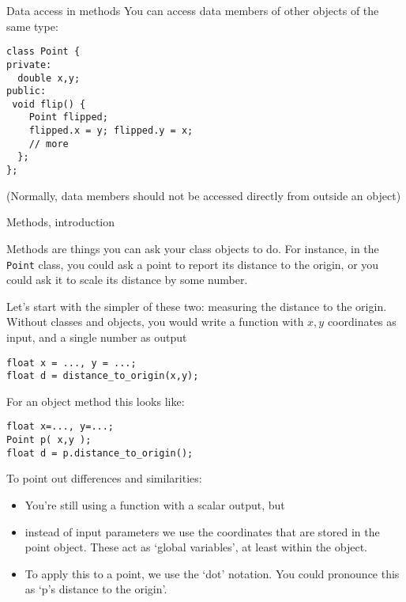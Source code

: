 \begin{slide}{Data access in methods}
  \label{sl:member-access-proper}
  You can access data members of other objects of the same type:
  \lstset{style=snippetcode}
\begin{lstlisting}
class Point {
private:
  double x,y;
public:
 void flip() {
    Point flipped;
    flipped.x = y; flipped.y = x;
    // more
  };
};
\end{lstlisting}
  (Normally, data members should not be accessed directly from outside an object)
\end{slide}

 {Methods, introduction}

Methods are things you can ask your class objects to do. For instance,
in the \lstinline{Point} class, you could ask
a point to report its distance to the origin,
or you could ask it to scale its distance by some number.

Let's start with the simpler of these two: measuring the distance to the origin.
Without classes and objects, you would write a function with $x,y$ coordinates
as input,
and a single number as output
\begin{lstlisting}
float x = ..., y = ...;
float d = distance_to_origin(x,y);
\end{lstlisting}

For an object method this looks like:
\begin{lstlisting}
float x=..., y=...;
Point p( x,y );
float d = p.distance_to_origin();
\end{lstlisting}
To point out differences and similarities:
\begin{itemize}
\item
  You're still using a function with a scalar output, but
\item instead of input parameters we use the coordinates
  that are stored in the point object.
  These act as `global variables', at least within the object.
\item To apply this to a point, we use the `dot' notation.
  You could pronounce this as `p's distance to the origin'.
\end{itemize}


